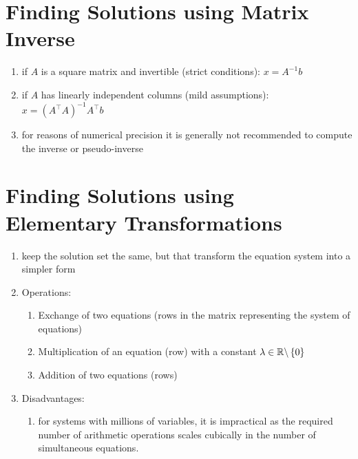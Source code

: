 \section{Finding Solutions using Matrix Inverse}

\begin{enumerate}
    \item if $A$ is a square matrix and invertible (strict conditions): $x = A^{-1}b$
    \hfill \cite{mfml/book/mml/Deisenroth-Faisal-Ong}

    \item if $A$ has linearly independent columns (mild assumptions): $x = (A^\top  A)^{-1}A^\top b$
    \hfill \cite{mfml/book/mml/Deisenroth-Faisal-Ong}

    \item for reasons of numerical precision it is generally not recommended to compute the inverse or pseudo-inverse
    \hfill \cite{mfml/book/mml/Deisenroth-Faisal-Ong}
\end{enumerate}


\section{Finding Solutions using Elementary Transformations}

\begin{enumerate}
    \item keep the solution set the same, but that transform the equation system into a simpler form
    \hfill \cite{mfml/book/mml/Deisenroth-Faisal-Ong}

    \item Operations:
    \begin{enumerate}
        \item Exchange of two equations (rows in the matrix representing the system of equations)
        \hfill \cite{mfml/book/mml/Deisenroth-Faisal-Ong}

        \item Multiplication of an equation (row) with a constant $\lambda \in \mathbb{R} \backslash \left\{0\right\}$
        \hfill \cite{mfml/book/mml/Deisenroth-Faisal-Ong}

        \item Addition of two equations (rows) 
        \hfill \cite{mfml/book/mml/Deisenroth-Faisal-Ong}
    \end{enumerate}

    \item Disadvantages:
    \begin{enumerate}
        \item for systems with millions of variables, it is impractical as the required number of arithmetic operations scales cubically in the number of simultaneous equations.
        \hfill \cite{mfml/book/mml/Deisenroth-Faisal-Ong}
    \end{enumerate}
\end{enumerate}



